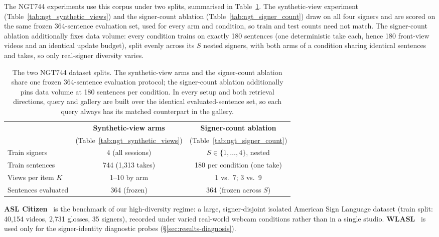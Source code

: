 The NGT744 experiments use this corpus under two splits, summarised
in Table~\ref{tab:ngt_setups}. The synthetic-view experiment
(Table~\ref{tab:ngt_synthetic_views}) and the signer-count
ablation (Table~\ref{tab:ngt_signer_count}) draw on all four
signers and are scored on the same frozen 364-sentence evaluation set,
used for every arm and condition, so train and test counts need not
match. 
The signer-count ablation additionally fixes data
volume: every condition trains on exactly 180 sentences (one deterministic
take each, hence 180 front-view videos and an identical update budget),
split evenly across its $S$ nested signers, with both arms of a condition
sharing identical sentences and takes, so only real-signer diversity
varies.
\begin{table}[t]
\centering
\footnotesize
\setlength{\tabcolsep}{4pt}
\begin{tabular}{lcc}
\toprule
 & \textbf{Synthetic-view arms} & \textbf{Signer-count ablation} \\
 & (Table~\ref{tab:ngt_synthetic_views}) & (Table~\ref{tab:ngt_signer_count}) \\
\midrule
Train signers & 4 (all sessions) & $S\in\{1,\ldots,4\}$, nested \\
Train sentences & 744 (1{,}313 takes) & 180 per condition (one take) \\
Views per item $K$ & 1--10 by arm & 1 vs.\ 7; 3 vs.\ 9 \\
Sentences evaluated & 364 (frozen) & 364 (frozen across $S$) \\
\bottomrule
\end{tabular}
\caption[The two NGT744 dataset splits]{The two NGT744 dataset splits. The synthetic-view arms and the
signer-count ablation
share one frozen 364-sentence evaluation protocol; the signer-count
ablation additionally pins data volume at 180 sentences per condition. In
every setup and both retrieval directions, query and gallery are built
over the identical evaluated-sentence set, so each query always has its
matched counterpart in the gallery.}
\label{tab:ngt_setups}
\end{table}

\textbf{ASL Citizen}~\cite{aslcitizen} is the benchmark of our
high-diversity regime: a
large, signer-disjoint isolated American Sign Language dataset (train split:
40{,}154 videos, 2{,}731 glosses, 35 signers), recorded under varied
real-world webcam conditions rather than in a single studio.
\textbf{WLASL}~\cite{WLASL} is used only for the signer-identity diagnostic probes
(\S\ref{sec:results-diagnosis}).

